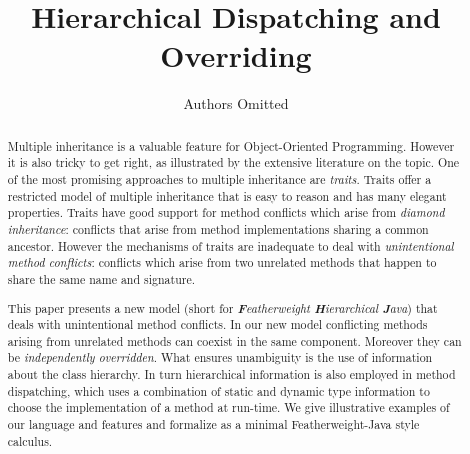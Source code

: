 \documentclass{llncs}
\begin{document}
\title{Hierarchical Dispatching and Overriding}

\author{Authors Omitted}

\institute{}

\maketitle

\begin{abstract}
Multiple inheritance is a valuable feature for Object-Oriented
Programming. However it is also tricky to get right, as illustrated by
the extensive literature on the topic. One of the most promising 
approaches to multiple inheritance are \emph{traits}. Traits offer a
restricted model of multiple inheritance that is easy to reason and 
has many elegant properties. Traits have good support for method 
conflicts which arise from \emph{diamond inheritance}:
conflicts that arise from method implementations sharing a common 
ancestor. However the mechanisms of traits are inadequate to deal 
with \emph{unintentional method conflicts}: conflicts which 
arise from two unrelated methods that happen to share the same name
and signature. 

This paper presents a new model \name{} 
(short for \emph{\textbf{F}eatherweight \textbf{H}ierarchical \textbf{J}ava}) 
that deals with unintentional
method conflicts. In our new model conflicting methods arising
from unrelated methods can coexist in the same component. Moreover they
can be \emph{independently overridden}. What ensures unambiguity 
is the use of information about the class hierarchy. In turn
hierarchical information is also employed in method dispatching, which 
uses a combination of static and dynamic type information to choose 
the implementation of a method at run-time. We give illustrative 
examples of our language and features and formalize \name{} as a minimal 
Featherweight-Java style calculus. 

\end{abstract}



\end{document}
